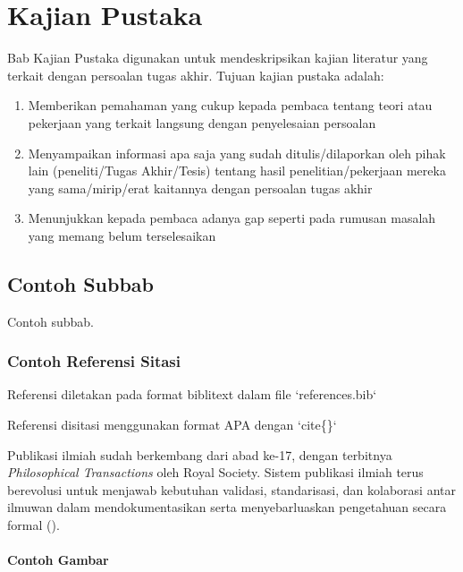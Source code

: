 
\chapter{Kajian Pustaka}

Bab Kajian Pustaka digunakan untuk mendeskripsikan kajian literatur yang terkait dengan persoalan tugas akhir. Tujuan kajian pustaka adalah:

\begin{enumerate}
    \item Memberikan pemahaman yang cukup kepada pembaca tentang teori atau pekerjaan yang terkait langsung dengan penyelesaian persoalan
    \item Menyampaikan informasi apa saja yang sudah ditulis/dilaporkan oleh pihak lain (peneliti/Tugas Akhir/Tesis) tentang hasil penelitian/pekerjaan mereka yang sama/mirip/erat kaitannya dengan persoalan tugas akhir
    \item Menunjukkan kepada pembaca adanya gap seperti pada rumusan masalah yang memang belum terselesaikan
\end{enumerate}

\section{Contoh Subbab}

Contoh subbab.

\subsection{Contoh Referensi Sitasi}

Referensi diletakan pada format biblitext dalam file `references.bib`

Referensi disitasi menggunakan format APA dengan `cite\{\}`

Publikasi ilmiah sudah berkembang dari abad ke-17, dengan terbitnya \textit{Philosophical Transactions} oleh Royal Society. Sistem publikasi ilmiah terus berevolusi untuk menjawab kebutuhan validasi, standarisasi, dan kolaborasi antar ilmuwan dalam mendokumentasikan serta menyebarluaskan pengetahuan secara formal (\cite{fyfe2022}).

\subsubsection{Contoh Gambar}

